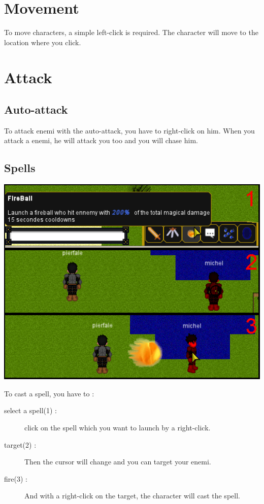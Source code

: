 \documentclass{scrreprt}
\begin{document}
		  \section{Movement}
		To move characters, a simple left-click is required. The character will move to the location where you click.
		  \section{Attack}
		  \subsection{Auto-attack}
		To attack enemi with the auto-attack, you have to right-click on him. When you attack a enemi, he will attack you too and you will chase him.
		  \subsection{Spells}
		\begin{center}
		\includegraphics[scale=0.4]{cast_spell.png}
		\end{center}
		To cast a spell, you have to :
 		\begin{description}
  		\item[select a spell(1) :]{click on the spell which you want to launch by a right-click.} 
		\item[target(2) :]{Then the cursor will change and you can target your enemi.}
		\item[fire(3) :]{And with a right-click on the target, the character will cast the spell.}
		 \end{description}
\end{document}
